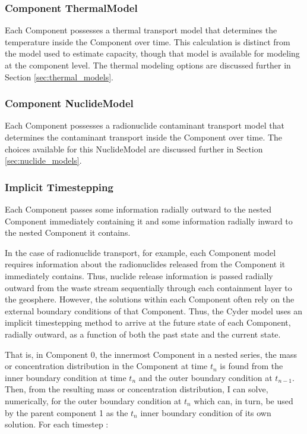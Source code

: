 \subsubsection{Component ThermalModel}

Each Component possesses a thermal transport model that determines the 
temperature inside the Component over time. This calculation is distinct from 
the model used to estimate capacity, though that model is  available for 
modeling at the component level. The thermal modeling options are discussed 
further in Section \ref{sec:thermal_models}.  

\subsubsection{Component NuclideModel}

Each Component possesses a radionuclide contaminant transport model that 
determines the contaminant transport inside the Component over time. The 
choices available for this NuclideModel are discussed further in Section 
\ref{sec:nuclide_models}. 

\subsubsection{Implicit Timestepping}

Each Component passes some information radially outward to the nested 
Component immediately containing it and some information radially 
inward to the nested Component it contains. 


In the case of radionuclide transport, for example, each Component model
requires information about the radionuclides released from the Component it
immediately contains.  Thus, nuclide release information is passed radially
outward from the waste stream sequentially through each containment layer to
the geosphere. However, the solutions within each Component often rely on the
external boundary conditions of that Component.  Thus, the Cyder model uses an
implicit timestepping method to arrive at the future state of each Component,
radially outward, as a function of both the past state and the current state. 

That is, in Component 0, the innermost Component in a nested series, the mass or concentration 
distribution in the Component at time $t_n$ is found from the inner boundary 
condition at time $t_n$ and the outer boundary condition at $t_{n-1}$. Then, from 
the resulting mass or concentration distribution, I can solve, numerically, for 
the outer boundary condition at $t_n$ which can, in turn, be used by the parent 
component 1 as the $t_n$ inner boundary condition of its own solution. For each timestep :

